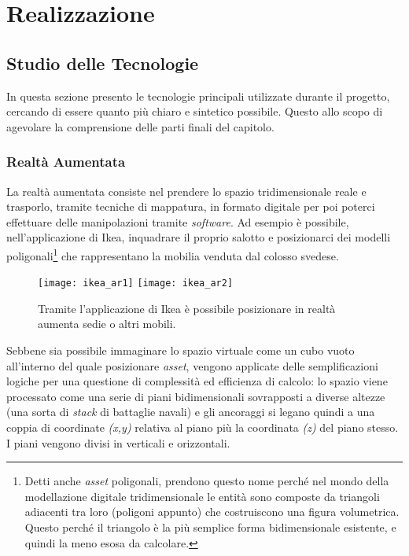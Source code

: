 
\chapter{Realizzazione}
\label{cap:realizzazione}

\section{Studio delle Tecnologie}
In questa sezione presento le tecnologie principali utilizzate durante il progetto, cercando di essere quanto più chiaro e sintetico possibile. Questo allo scopo di agevolare la comprensione delle parti finali del capitolo.

\subsection{Realtà Aumentata}
La realtà aumentata consiste nel prendere lo spazio tridimensionale reale e trasporlo, tramite tecniche di mappatura, in formato digitale per poi poterci effettuare delle manipolazioni tramite \textit{software}. Ad esempio è possibile, nell'applicazione di Ikea, inquadrare il proprio salotto e posizionarci dei modelli poligonali\footnote{Detti anche \textit{asset} poligonali, prendono questo nome perché nel mondo della modellazione digitale tridimensionale le entità sono composte da triangoli adiacenti tra loro (poligoni appunto) che costruiscono una figura volumetrica. Questo perché il triangolo è la più semplice forma bidimensionale esistente, e quindi la meno esosa da calcolare.} che rappresentano la mobilia venduta dal colosso svedese.\\

\begin{figure}[H]
  \centering
  \texttt{[image: ikea\_ar1]}\hspace{20mm}
  \texttt{[image: ikea\_ar2]}
  \caption[Ikea realtà aumentata \textit{in-app}]{Tramite l'applicazione di Ikea è possibile posizionare in realtà aumenta sedie o altri mobili.}
\end{figure}

Sebbene sia possibile immaginare lo spazio virtuale come un cubo vuoto all'interno del quale posizionare \textit{asset}, vengono applicate delle semplificazioni logiche per una questione di complessità ed efficienza di calcolo: lo spazio viene processato come una serie di piani bidimensionali sovrapposti a diverse altezze (una sorta di \textit{stack} di battaglie navali) e gli ancoraggi si legano quindi a una coppia di coordinate \textit{(x,y)} relativa al piano più la coordinata \textit{(z)} del piano stesso. I piani vengono divisi in verticali e orizzontali.


